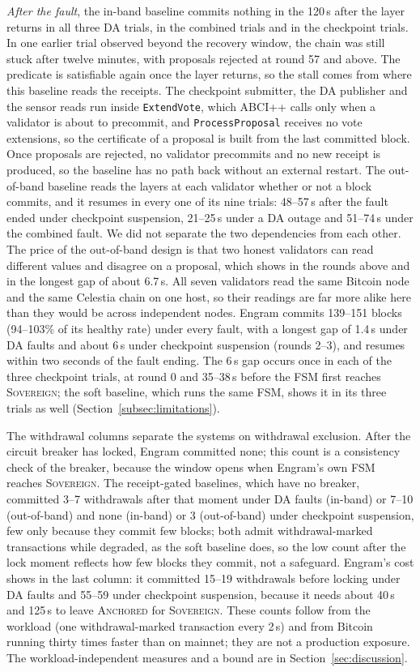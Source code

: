 \emph{After the fault}, the in-band baseline commits nothing in the 120\,s
after the layer returns in all three DA trials, in the combined trials and in
the checkpoint trials. In one earlier trial observed beyond the recovery
window, the chain was still stuck after twelve minutes, with proposals rejected
at round 57 and above. The predicate is satisfiable again once the layer
returns, so the stall comes from where this baseline reads the receipts. The
checkpoint submitter, the DA publisher and the sensor reads run inside
\texttt{ExtendVote}, which ABCI++ calls only when a validator is about to
precommit, and \texttt{ProcessProposal} receives no vote extensions, so the
certificate of a proposal is built from the last committed block. Once
proposals are rejected, no validator precommits and no new receipt is produced,
so the baseline has no path back without an external restart. The out-of-band
baseline reads the layers at each validator whether or not a block commits, and
it resumes in every one of its nine trials: 48--57\,s after the fault ended under
checkpoint suspension, 21--25\,s under a DA outage and 51--74\,s under the
combined fault. We did not separate the two dependencies from each other. The price of the
out-of-band design is that two honest validators can read different values and
disagree on a proposal, which shows in the rounds above and in the longest gap
of about 6.7\,s. All seven validators read the same Bitcoin node and the same
Celestia chain on one host, so their readings are far more alike here than they
would be across independent nodes.
Engram commits 139--151 blocks (94--103\% of its healthy
rate) under every fault, with a longest gap of 1.4\,s under DA faults and about 6\,s
under checkpoint suspension (rounds 2--3), and resumes within two seconds of the fault ending.
The 6\,s gap occurs once in each of the three checkpoint trials, at round 0 and
35--38\,s before the FSM first reaches \textsc{Sovereign}; the soft baseline, which
runs the same FSM, shows it in its three trials as well (Section~\ref{subsec:limitations}).

The withdrawal columns separate the systems on withdrawal exclusion. After the circuit
breaker has locked, Engram committed none; this count is a consistency check of
the breaker, because the window opens when Engram's own FSM reaches
\textsc{Sovereign}. The receipt-gated baselines, which have no breaker, committed 3--7
withdrawals after that moment under DA faults (in-band) or 7--10 (out-of-band) and
none (in-band) or 3 (out-of-band) under checkpoint suspension, few only because they commit few blocks; both
admit withdrawal-marked transactions while degraded, as the soft baseline does, so
the low count after the lock moment reflects how few blocks they commit, not a
safeguard. Engram's cost shows in the
last column: it committed 15--19 withdrawals before locking under DA faults and
55--59 under checkpoint suspension, because it needs about 40\,s and 125\,s to
leave \textsc{Anchored} for \textsc{Sovereign}. These counts follow from the
workload (one withdrawal-marked transaction every 2\,s) and from Bitcoin running
thirty times faster than on mainnet; they are not a production exposure. The
workload-independent measures and a bound are in Section~\ref{sec:discussion}. 

